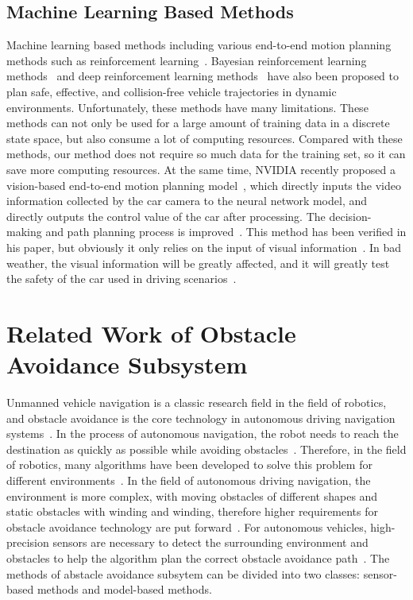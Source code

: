\documentclass[conference]{IEEEtran}
\begin{document}
\subsection{Machine Learning Based Methods}

Machine learning based methods including various end-to-end motion planning methods such as reinforcement learning~\cite{wang2012monte}. Bayesian reinforcement learning methods~\cite{wang2012monte} and deep reinforcement learning methods~\cite{everett2018motion} have also been proposed to plan safe, effective, and collision-free vehicle trajectories in dynamic environments. Unfortunately, these methods have many limitations. These methods can not only be used for a large amount of training data in a discrete state space, but also consume a lot of computing resources. Compared with these methods, our method does not require so much data for the training set, so it can save more computing resources. At the same time, NVIDIA recently proposed a vision-based end-to-end motion planning model~\cite{bojarski2016end}, which directly inputs the video information collected by the car camera to the neural network model, and directly outputs the control value of the car after processing. The decision-making and path planning process is improved~\cite{bojarski2016end}. This method has been verified in his paper, but obviously it only relies on the input of visual information~\cite{bojarski2016end}. In bad weather, the visual information will be greatly affected, and it will greatly test the safety of the car used in driving scenarios~\cite{bojarski2016end}.

\section{Related Work of Obstacle Avoidance Subsystem}\label{sec:obstacle_avoider}
Unmanned vehicle navigation is a classic research field in the field of robotics, and obstacle avoidance is the core technology in autonomous driving navigation systems~\cite{self_driving}. In the process of autonomous navigation, the robot needs to reach the destination as quickly as possible while avoiding obstacles~\cite{self_driving}. Therefore, in the field of robotics, many algorithms have been developed to solve this problem for different environments~\cite{self_driving}. In the field of autonomous driving navigation, the environment is more complex, with moving obstacles of different shapes and static obstacles with winding and winding, therefore higher requirements for obstacle avoidance technology are put forward~\cite{self_driving}. For autonomous vehicles, high-precision sensors are necessary to detect the surrounding environment and obstacles to help the algorithm plan the correct obstacle avoidance path~\cite{self_driving}. The methods of abstacle avoidance subsytem can be divided into two classes: sensor-based methods and model-based methods.
\end{document}
